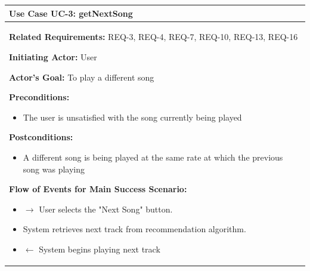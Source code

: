 \documentclass[letterpaper,english, 12pt]{scrreprt}
\begin{document}
\begin{center}
        \begin{tabular}{|C{15cm}|}
                \hline
                        \textbf{Use Case UC-3: getNextSong}\\
                \hline
                        \begin{flushleft}
                                \textbf{Related Requirements: } REQ-3, REQ-4, REQ-7, REQ-10, REQ-13, REQ-16
                        \end{flushleft}
                        \begin{flushleft}
                                \textbf{Initiating Actor: } User
                        \end{flushleft}
                        \begin{flushleft}
                                \textbf{Actor's Goal: } To play a different song
                        \end{flushleft}
                        \begin{flushleft}
                                \textbf{Preconditions: }
                        \end{flushleft}
                                \begin{itemize}
                                        \item The user is unsatisfied with the song currently being played
                                \end{itemize}
                        \begin{flushleft}
                                \textbf{Postconditions: }
                        \end{flushleft}
                                \begin{itemize}
                                        \item A different song is being played at the same rate at which the previous song was playing
                                \end{itemize}
                        \begin{flushleft}
                                \textbf{Flow of Events for Main Success Scenario: }
                        \end{flushleft}
                                \begin{itemize}
                                        \item $\rightarrow$ User selects the "Next Song" button.
                                        \item System retrieves next track from recommendation algorithm.
                                        \item $\leftarrow$ System begins playing next track
                                \end{itemize}
                \hline
        \end{tabular}
\end{center}
\end{document}
